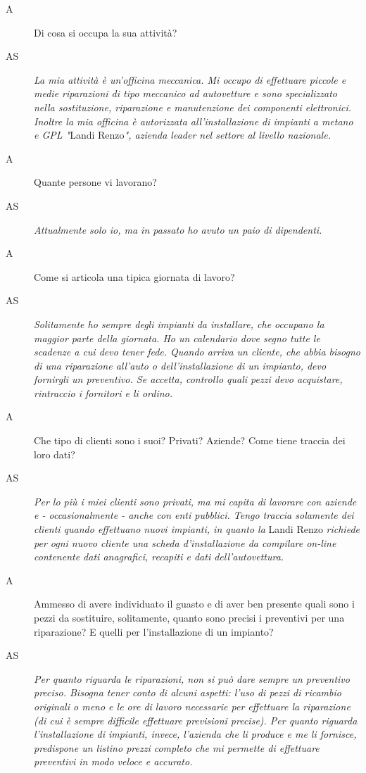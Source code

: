 		\begin{description}
			\item[A] 
				Di cosa si occupa la sua attività?
			\item[AS] 
				\emph{La mia attività è un'officina meccanica. Mi occupo di effettuare piccole e medie riparazioni di tipo meccanico ad autovetture e sono specializzato nella sostituzione, riparazione e manutenzione dei componenti elettronici. Inoltre la mia officina è autorizzata all'installazione di impianti a metano e GPL "}Landi Renzo\emph{", azienda leader nel settore al livello nazionale.}
			\item[A]
				Quante persone vi lavorano?
			\item[AS]
				\emph{Attualmente solo io, ma in passato ho avuto un paio di dipendenti.}
			\item[A]
				Come si articola una tipica giornata di lavoro?
			\item[AS]
				\emph{Solitamente ho sempre degli impianti da installare, che occupano la maggior parte della giornata. Ho un calendario dove segno tutte le scadenze a cui devo tener fede. Quando arriva un cliente, che abbia bisogno di una riparazione all'auto o dell'installazione di un impianto, devo fornirgli un preventivo. Se accetta, controllo quali pezzi devo acquistare, rintraccio i fornitori e li ordino.}
			\item[A]
				Che tipo di clienti sono i suoi? Privati? Aziende? Come tiene traccia dei loro dati?
			\item[AS]
				\emph{Per lo più i miei clienti sono privati, ma mi capita di lavorare con aziende e - occasionalmente - anche con enti pubblici. Tengo traccia solamente dei clienti quando effettuano nuovi impianti, in quanto la} Landi Renzo \emph{richiede per ogni nuovo cliente una scheda d'installazione da compilare on-line contenente dati anagrafici, recapiti e dati  dell'autovettura.}
			\item[A]
				Ammesso di avere individuato il guasto e di aver ben presente quali sono i pezzi da sostituire, solitamente, quanto sono precisi i preventivi per una riparazione? E quelli per l'installazione di un impianto?
 			\item[AS]
 				\emph{Per quanto riguarda le riparazioni, non si può dare sempre un preventivo preciso. Bisogna tener conto di alcuni aspetti: l'uso di pezzi di ricambio originali o meno e le ore di lavoro necessarie per effettuare la riparazione (di cui è sempre difficile effettuare previsioni precise). Per quanto riguarda l'installazione di impianti, invece, l'azienda che li produce e me li fornisce, predispone un listino prezzi completo che mi permette di effettuare preventivi in modo veloce e accurato.}

\end{description}
